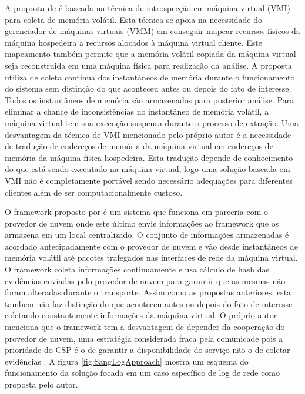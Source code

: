 A proposta de \cite{PoiselVMI:2013} é baseada na técnica de introspecção em máquina virtual (VMI) para coleta de memória volátil. 
%
Esta técnica se apoia na necessidade do gerenciador de máquinas virtuais (VMM) em conseguir mapear recursos físicos da máquina hospedeira a recursos alocados à máquina virtual cliente.
%
Este mapeamento também permite que a memória volátil copiada da máquina virtual seja reconstruida em uma máquina física para realização da análise.
%
A proposta utiliza de coleta continua dos instantâneos de memória durante o funcionamento do sistema sem distinção do que aconteceu antes ou depois do fato de interesse.
%
Todos os instantâneos de memória são armazenados para posterior análise.
%
Para eliminar a chance de inconsistências no instantâneo de memória volátil, a máquina virtual tem sua execução suspensa durante o processo de extração.
%
Uma desvantagem da técnica de VMI mencionado pelo próprio autor é a necessidade de tradução de endereços de memória da máquina virtual em endereços de memória da máquina física hospedeira.
%
Esta tradução depende de conhecimento do que está sendo executado na máquina virtual, logo uma solução baseada em VMI não é completamente portável sendo necessário adequações para diferentes clientes além de ser computacionalmente custoso.
%

O framework proposto por \cite{SangLogApproach:2013} é um sistema que funciona em parceria com o provedor de nuvem onde este último envie informações ao framework que os armazena em um local centralizado.
%
O conjunto de informações armazenadas é acordado antecipadamente com o provedor de nuvem e vão desde instantâneos de memória volátil até pacotes trafegados nas interfaces de rede da máquina virtual.
%
O framework coleta informações continuamente e usa cálculo de hash das evidências enviadas pelo provedor de nuvem para garantir que as mesmas não foram alteradas durante o transporte.
%
Assim como as propostas anteriores, esta tambem não faz distinção do que aconteceu antes ou depois do fato de interesse coletando constantemente informações da máquina virtual.
%
O próprio autor menciona que o framework tem a desvantagem de depender da cooperação do provedor de nuvem, uma estratégia considerada fraca pela comunicade pois a prioridade do CSP é o de garantir a disponibilidade do serviço não o de coletar evidências \cite{ClarkeReviewOfChallenges2015}.
%
A figura \ref{fig:SangLogApproach} mostra um esquema do funcionamento da solução focada em um caso específico de log de rede como proposta pelo autor.

